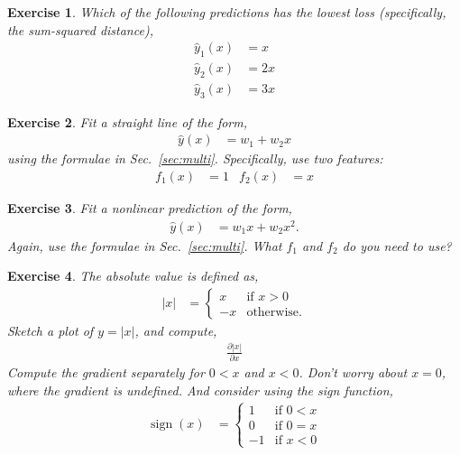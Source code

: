 \documentclass{article}
\newtheorem{exercise}{Exercise}
\newcommand{\dd}[2][]{\frac{\partial #1}{\partial #2}}
\begin{document}
\begin{exercise}
  Which of the following predictions has the lowest loss (specifically, the sum-squared distance),
  \begin{align}
    \hat{y}_1(x) &= x\\
    \hat{y}_2(x) &= 2 x\\
    \hat{y}_3(x) &= 3 x
  \end{align}
\end{exercise}

\begin{exercise}
  Fit a straight line of the form,
  \begin{align}
    \label{eq:q3_yh}
    \hat{y}(x) &= w_1 + w_2 x
  \end{align}
  using the formulae in Sec.~\ref{sec:multi}.
  Specifically, use two features:
  \begin{align}
    f_1(x) &= 1 & 
    f_2(x) &= x
  \end{align}
\end{exercise}

\begin{exercise}
  Fit a nonlinear prediction of the form,
  \begin{align}
    \label{eq:q4_yh}
    \hat{y}(x) &= w_1 x + w_2 x^2.
  \end{align}
  Again, use the formulae in Sec.~\ref{sec:multi}.  What $f_1$ and $f_2$ do you need to use?
\end{exercise}

\begin{exercise}
  The absolute value is defined as,
  \begin{align}
  |x| &= \begin{cases}
    x & \text{if } x>0\\
    -x & \text{otherwise}.
  \end{cases}
  \end{align}
  Sketch a plot of $y = |x|$, and compute,
  \begin{align}
    \dd[|x|]{x}  
  \end{align}
  Compute the gradient separately for $0 < x$ and $x < 0$. Don't worry about $x=0$, where the gradient is undefined.  And consider using the sign function,
  \begin{align}
    \operatorname{sign}(x) &= \begin{cases}
      1 &\textrm{if } 0 < x\\
      0 &\textrm{if } 0 = x\\
      -1 &\textrm{if } x < 0
    \end{cases}
  \end{align}
\end{exercise}
\end{document}
